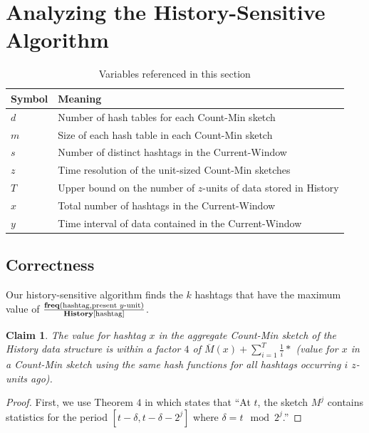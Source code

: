 \documentclass[twoside]{article}
\newtheorem{claim}{Claim}
\newcommand{\cc}[1]
 {\textbf{\cite{#1}}}
\begin{document}
{%

\section{Analyzing the History-Sensitive Algorithm}

\begin{table}[h]
\centering
\begin{tabular}{@{}ll@{}}
\toprule
Symbol & Meaning                                                           \\ \midrule
$d$      & Number of hash tables for each Count-Min sketch                        \\
$m$      & Size of each hash table in each Count-Min sketch                  \\
$s$      & Number of distinct hashtags in the Current-Window                 \\
$z$      & Time resolution of the unit-sized Count-Min sketches                   \\
$T$      & Upper bound on the number of $z$-units of data stored in History                   \\
$x$      & Total number of hashtags in the Current-Window                   \\
$y$      & Time interval of data contained in the Current-Window                   \\ \bottomrule
\end{tabular}
\caption{Variables referenced in this section}
\end{table}

\newpage
\subsection{Correctness} \label{sec:Correctness}

Our history-sensitive algorithm finds the $k$ hashtags that have the maximum value of 
$
\frac{\textbf{freq}(\textnormal{hashtag}, \textnormal{present } y \textnormal{-unit})}{\textbf{History}[\textnormal{hashtag}]}
$.

\begin{claim}
The value for hashtag $x$ in the aggregate Count-Min sketch of the History data structure is within a factor $4$ of $\overline{M}(x) + \sum\limits_{i=1}^T \frac{1}{i}*$ (value for $x$ in a Count-Min sketch using the same hash functions for all hashtags occurring $i$ $z$-units ago).
\end{claim}
\begin{proof}
First, we use Theorem $4$ in \cc{Matusevych:2012} which states that ``At $t$, the sketch $M^j$ contains statistics for the period $[t - \delta, t - \delta - 2^j]$ where $\delta = t \mod 2^j$.''


\end{proof}}
\end{document}
